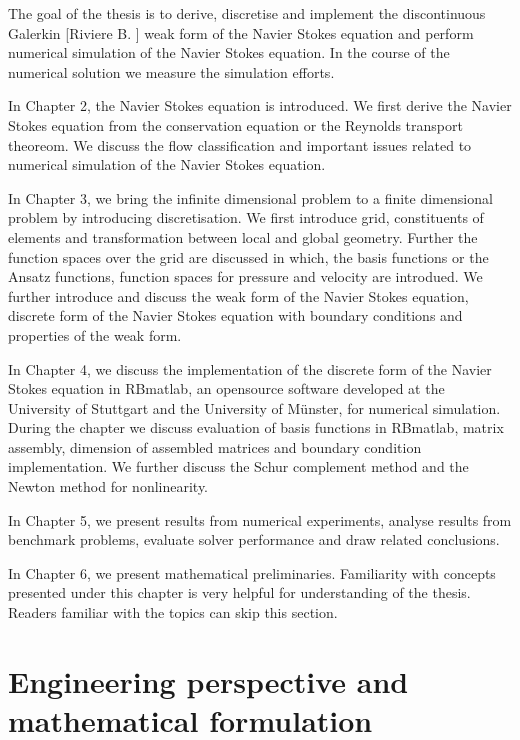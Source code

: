 \documentclass[a4paper]{book}
\begin{document}
The goal of the thesis is to derive, discretise and implement the discontinuous Galerkin [Riviere B. \cite{riviere}] weak form of the Navier Stokes equation and perform numerical simulation of the Navier Stokes equation. In the course of the numerical solution we measure the simulation efforts. 

In Chapter 2, the Navier Stokes equation is introduced. We first derive the Navier Stokes equation from the conservation equation or the Reynolds transport theoreom. We discuss the flow classification and important issues related to numerical simulation of the Navier Stokes equation. 

In Chapter 3, we bring the infinite dimensional problem to a finite dimensional problem by introducing discretisation. We first introduce grid, constituents of elements and transformation between local and global geometry. Further the function spaces over the grid are discussed in which, the basis functions or the Ansatz functions, function spaces for pressure and velocity are introdued. We further introduce and discuss the weak form of the Navier Stokes equation, discrete form of the Navier Stokes equation with boundary conditions and properties of the weak form.

In Chapter 4, we discuss the implementation of the discrete form of the Navier Stokes equation in RBmatlab, an opensource software developed at the University of Stuttgart and the University of M\"unster, for numerical simulation. During the chapter we discuss evaluation of basis functions in RBmatlab, matrix assembly, dimension of assembled matrices and boundary condition implementation. We further discuss the Schur complement method and the Newton method for nonlinearity.

In Chapter 5, we present results from numerical experiments, analyse results from benchmark problems, evaluate solver performance and draw related conclusions.

In Chapter 6, we present mathematical preliminaries. Familiarity with concepts presented under this chapter is very helpful for understanding of the thesis. Readers familiar with the topics can skip this section.

\newpage

\chapter[Perspective and formulation]{Engineering perspective and mathematical formulation} 
\end{document}
